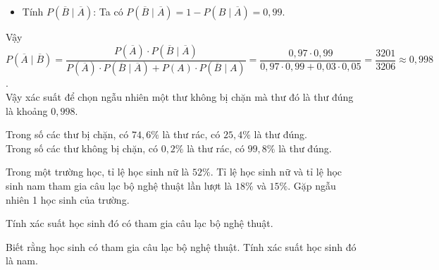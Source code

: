 \begin{bt}
{\begin{listEX}
\begin{itemize}
	\item Tính $P(\overline{B} \mid \overline{A})$: Ta có $P(\overline{B} \mid \overline{A})=1-P(B \mid \overline{A})=0{,}99$.
	\end{itemize}
	Vậy $P(\overline{A}\mid \overline{B}) = \dfrac{P(\overline{A})\cdot P(\overline{B}\mid \overline{A})}{P(\overline{A})\cdot P(\overline{B}\mid \overline{A}) + P(A)\cdot P(\overline{B} \mid A)}=\dfrac{0{,}97\cdot 0{,}99}{0{,}97\cdot 0{,}99+0{,}03\cdot 0{,}05}=\dfrac{3201}{3206}\approx 0{,}998$.\\
	Vậy xác suất để chọn ngẫu nhiên một thư không bị chặn mà thư đó là thư đúng là khoảng $0{,}998$.
	\item Trong số các thư bị chặn, có $74{,}6 \%$ là thư rác, có $25{,}4 \%$ là thư đúng. \\
	Trong số các thư không bị chặn, có $0{,}2 \%$ là thư rác, có $99{,}8 \%$ là thư đúng.
	\end{listEX}
	}
\end{bt}
\begin{bt}%
	Trong một trường học, tỉ lệ học sinh nữ là $52\%$. Tỉ lệ học sinh nữ và tỉ lệ học sinh nam
	tham gia câu lạc bộ nghệ thuật lần lượt là $18\%$ và $15\%$. Gặp ngẫu nhiên 1 học sinh của trường. 
	\begin{listEX}
	\item Tính xác suất học sinh đó có tham gia câu lạc bộ nghệ thuật. 
	\item Biết rằng học sinh có tham gia câu lạc bộ nghệ thuật. Tính xác suất học sinh đó là nam.
	\end{listEX}
\end{bt}
